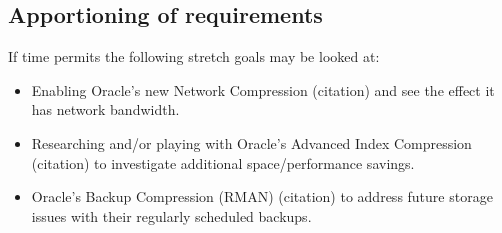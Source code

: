 \documentclass[10pt]{article}
\begin{document}
\subsection{Apportioning of requirements}

If time permits the following stretch goals may be looked at:
\begin{itemize}
	\item Enabling Oracle's new Network Compression (citation) and see the effect it has network bandwidth.
	\item Researching and/or playing with Oracle's Advanced Index Compression (citation) to investigate additional space/performance savings.
	\item Oracle's Backup Compression (RMAN) (citation) to address future storage issues with their regularly scheduled backups.
\end{itemize}
\end{document}
